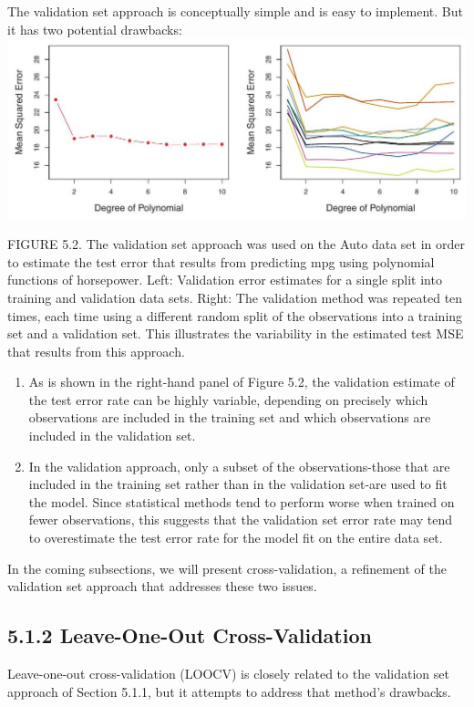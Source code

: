 \documentclass[10pt]{article}
\begin{document}
The validation set approach is conceptually simple and is easy to implement. But it has two potential drawbacks:\\
\includegraphics[max width=\textwidth, center]{2025_05_05_efe77898333945044de4g-193}

FIGURE 5.2. The validation set approach was used on the Auto data set in order to estimate the test error that results from predicting mpg using polynomial functions of horsepower. Left: Validation error estimates for a single split into training and validation data sets. Right: The validation method was repeated ten times, each time using a different random split of the observations into a training set and a validation set. This illustrates the variability in the estimated test MSE that results from this approach.

\begin{enumerate}
  \item As is shown in the right-hand panel of Figure 5.2, the validation estimate of the test error rate can be highly variable, depending on precisely which observations are included in the training set and which observations are included in the validation set.
  \item In the validation approach, only a subset of the observations-those that are included in the training set rather than in the validation set-are used to fit the model. Since statistical methods tend to perform worse when trained on fewer observations, this suggests that the validation set error rate may tend to overestimate the test error rate for the model fit on the entire data set.
\end{enumerate}

In the coming subsections, we will present cross-validation, a refinement of the validation set approach that addresses these two issues.

\subsection*{5.1.2 Leave-One-Out Cross-Validation}
Leave-one-out cross-validation (LOOCV) is closely related to the validation set approach of Section 5.1.1, but it attempts to address that method's drawbacks.
\end{document}
